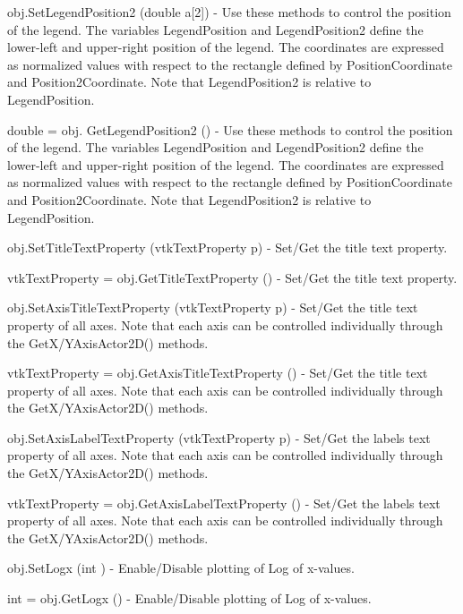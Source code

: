 \begin{DoxyItemize}
\item {\ttfamily obj.\-Set\-Legend\-Position2 (double a\mbox{[}2\mbox{]})} -\/ Use these methods to control the position of the legend. The variables Legend\-Position and Legend\-Position2 define the lower-\/left and upper-\/right position of the legend. The coordinates are expressed as normalized values with respect to the rectangle defined by Position\-Coordinate and Position2\-Coordinate. Note that Legend\-Position2 is relative to Legend\-Position.  
\item {\ttfamily double = obj. Get\-Legend\-Position2 ()} -\/ Use these methods to control the position of the legend. The variables Legend\-Position and Legend\-Position2 define the lower-\/left and upper-\/right position of the legend. The coordinates are expressed as normalized values with respect to the rectangle defined by Position\-Coordinate and Position2\-Coordinate. Note that Legend\-Position2 is relative to Legend\-Position.  
\item {\ttfamily obj.\-Set\-Title\-Text\-Property (vtk\-Text\-Property p)} -\/ Set/\-Get the title text property.  
\item {\ttfamily vtk\-Text\-Property = obj.\-Get\-Title\-Text\-Property ()} -\/ Set/\-Get the title text property.  
\item {\ttfamily obj.\-Set\-Axis\-Title\-Text\-Property (vtk\-Text\-Property p)} -\/ Set/\-Get the title text property of all axes. Note that each axis can be controlled individually through the Get\-X/\-Y\-Axis\-Actor2\-D() methods.  
\item {\ttfamily vtk\-Text\-Property = obj.\-Get\-Axis\-Title\-Text\-Property ()} -\/ Set/\-Get the title text property of all axes. Note that each axis can be controlled individually through the Get\-X/\-Y\-Axis\-Actor2\-D() methods.  
\item {\ttfamily obj.\-Set\-Axis\-Label\-Text\-Property (vtk\-Text\-Property p)} -\/ Set/\-Get the labels text property of all axes. Note that each axis can be controlled individually through the Get\-X/\-Y\-Axis\-Actor2\-D() methods.  
\item {\ttfamily vtk\-Text\-Property = obj.\-Get\-Axis\-Label\-Text\-Property ()} -\/ Set/\-Get the labels text property of all axes. Note that each axis can be controlled individually through the Get\-X/\-Y\-Axis\-Actor2\-D() methods.  
\item {\ttfamily obj.\-Set\-Logx (int )} -\/ Enable/\-Disable plotting of Log of x-\/values.  
\item {\ttfamily int = obj.\-Get\-Logx ()} -\/ Enable/\-Disable plotting of Log of x-\/values.  

\end{DoxyItemize}
